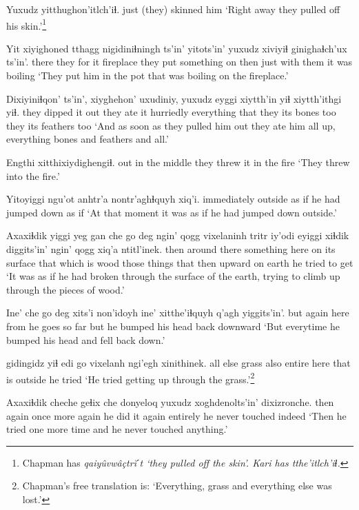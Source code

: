 \documentclass[12pt]{article}
\begin{document}
\gll Yuxudz yitthughon'itlch'iɬ.
just {(they) skinned him}  
\glt `Right away they pulled off his skin.'\footnote{Chapman has \em qaiy\^uvw\^a\c{c}tr\u{i}ˊt \em `they pulled off the skin'. Kari has \em tthe'itlch'iɬ.}
\glend

\gll Yit   xiyighoned tthagg nigidiniɬningh ts'in' yitots'in' yuxudz xiviyiɬ ginighaɬch'ux ts'in'.
there {they for it}  fireplace {they put something on} {} then  just  {with them} {it was boiling}  
\glt `They put him in the pot that was boiling on the fireplace.'
\glend

\gll Dixiyiniɬqon'  ts'in', xiyghehon'  uxudiniy, yuxudz eyggi xiytth'in yiɬ xiytth'ithgi  yiɬ.
{they dipped it out}  {} {they ate it}  hurriedly everything that {they its bones} too {they its feathers}  too
\glt `And as soon as they pulled him out they ate him all up, everything bones and feathers and all.'
\glend

\gll Engthi  xitthixiydighengiɬ.
{out in the middle} {they threw it in the fire}
\glt `They threw into the fire.'
\glend

\gll Yitoyiggi ngu'ot  anhtr'a nontr'aghɬquyh xiq'i.
immediately outside   {as if}  {he had jumped down} {as if}
\glt `At that moment it was as if he had jumped down outside.'
\glend

\gll Axaxiɬdik {yiggi yeg} {gan che} {go deg} {ngin' qogg} vixelaninh tritr iy'odi  eyiggi xiɬdik diggits'in' {ngin' qogg} {xiq'a ntitl'inek.} 
then  {around there} something here {on its surface} {that which is} wood {those things} that then upward {on earth} {he tried to get}  
\glt `It was as if he had broken through the surface of the earth, trying to climb up through the pieces of wood.'
\glend

\gll Ine' che {go deg} xits'i {non'idoyh} ine' xitthe'iɬquyh q'agh yiggits'in'.
but again here from  {he goes so far} but {he bumped his head} back downward
\glt  `But everytime he bumped his head and fell back down.'
\glend

 gidingidz yiɬ edi  go vixelanh ngi'egh xinithinek.
{all else}  grass  also entire here {that is} outside  {he tried}
\glt `He tried getting up through the grass.'\footnote{Chapman's free translation is:  `Everything, grass and everything else was lost.'}
\glend

\gll Axaxiɬdik cheche geɬix che donyeloq yuxudz xoghdenolts'in' dixizronche.
then again {once more} again {he did it again}  entirely {he never touched} indeed
\glt `Then he tried one more time and he never touched anything.'
\glend
\end{document}
